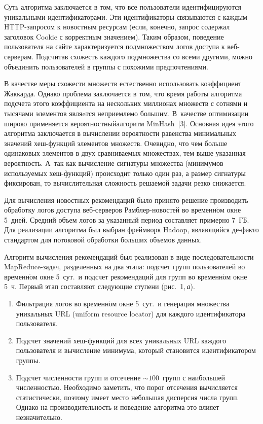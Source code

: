\begin{multicols}{2}
   Суть алгоритма заключается в том, что все пользователи идентифицируются 
уникальными идентификаторами. Эти идентификаторы связываются
 с каждым 
HTTP-за\-про\-сом к новостным ресурсам (если, конечно, запрос содержал 
заголовок Cookie с корректным значением). Таким образом, поведение 
пользователя на сайте характеризуется подмножеством логов доступа к 
   веб-сер\-ве\-рам. Подсчитав схожесть каждого подмножества со всеми 
другими, можно объединить пользователей в группы с похожими 
предпочтениями.


   
   В качестве меры схожести множеств естественно использовать коэффициент 
Жаккарда. Однако проблема заключается в том, что время работы алгоритма 
подсчета этого коэффициента на нескольких миллионах множеств с сотнями и 
тысячами элементов являeтся неприемлемо большим. В~качестве оптимизации 
широко применяется вероятностный\linebreak алгоритм MinHash~[3]. Основная идея 
этого алгоритма заключается в вычислении вероятности равенства 
минимальных значений хеш-функ\-ций элементов множеств. Очевидно, что чем 
больше одинако\-вых элементов в двух срав\-ни\-ва\-емых множествах, тем выше 
указанная вероятность. А~так как вычисление сигнатуры множества 
(минимумов используемых хеш-функ\-ций) происходит только один
 раз, а 
размер сигнатуры фиксирован, то вычислительная сложность решаемой задачи 
резко снижается.


   
   Для вычисления новостных рекомендаций было принято решение 
производить обработку логов доступа веб-сер\-ве\-ров Рамб\-лер-но\-во\-стей во 
временн$\acute{\mbox{о}}$м окне 5~дней. Средний объем логов за указанный период составляет 
примерно 7~ГБ. Для реализации алгоритма был выбран фреймворк Hadoop, 
являющийся де-фак\-то стандартом для потоковой обработки больших объемов 
данных.



   Алгоритм вычисления рекомендаций был реализован в виде 
последовательности MapReduce-за\-дач, разделенных на два этапа: подсчет групп 
пользователей во временн$\acute{\mbox{о}}$м окне 5~сут.\ и подсчет рекоменда\-ций для групп 
во временн$\acute{\mbox{о}}$м окне 5~ч. Первый этап составляют следующие ступени (рис.~1,\,\textit{а}).
   \begin{enumerate}[1.]
\item Фильтрация логов во временн$\acute{\mbox{о}}$м окне 5~сут.\ и генерация множества 
уникальных URL (uniform resource locator)
для каж\-до\-го идентификатора пользователя.
\item Подсчет значений хеш-функ\-ций для всех уникальных URL каждого 
пользователя и вычисление минимума, который становится 
идентификатором группы.
\item Подсчет численности групп и отсечение \mbox{$\sim100$}~групп с 
наибольшей численностью. Необходимо заметить, что порог отсечения 
вычисляется статистически, поэтому имеет место небольшая дисперсия 
числа групп. Однако на производительность и поведение алгоритма это 
влияет незначительно.
\end{enumerate}



\end{multicols}
